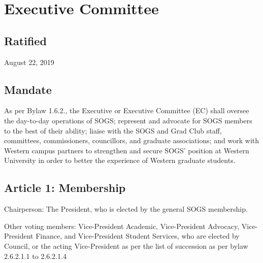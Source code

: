 \section{Executive Committee}

\subsection{Ratified}
August 22, 2019

\subsection{Mandate}
As per Bylaw 1.6.2., the Executive or Executive Committee (EC) shall oversee the day-to-day operations of SOGS; represent and advocate for SOGS members to the best of their ability; liaise with the SOGS and Grad Club staff, committees, commissioners, councillors, and graduate associations; and work with Western campus partners to strengthen and secure SOGS’ position at Western University in order to better the experience of Western graduate students.

\subsection{Article 1: Membership}
\begin{longenum}[ label*=\thesubsection.\arabic*., align=left] 
\item Chairperson: The President, who is elected by the general SOGS membership.
\item Other voting members: Vice-President Academic, Vice-President Advocacy, Vice-President Finance, and Vice-President Student Services, who are elected by Council, or the acting Vice-President as per the list of succession as per bylaw 2.6.2.1.1 to 2.6.2.1.4
\end{longenum}

